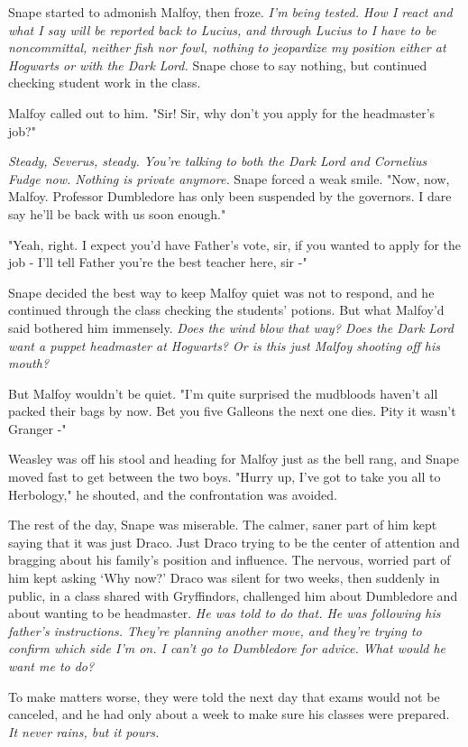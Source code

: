 Snape started to admonish Malfoy, then froze. \emph{I'm being tested. How I react and what I say will be reported back to Lucius, and through Lucius to{\el} I have to be noncommittal, neither fish nor fowl, nothing to jeopardize my position either at Hogwarts or with the Dark Lord.} Snape chose to say nothing, but continued checking student work in the class.

Malfoy called out to him. "Sir! Sir, why don't you apply for the headmaster's job?"

\emph{Steady, Severus, steady. You're talking to both the Dark Lord and Cornelius Fudge now. Nothing is private anymore.} Snape forced a weak smile. "Now, now, Malfoy. Professor Dumbledore has only been suspended by the governors. I dare say he'll be back with us soon enough."

"Yeah, right. I expect you'd have Father's vote, sir, if you wanted to apply for the job - I'll tell Father you're the best teacher here, sir -"

Snape decided the best way to keep Malfoy quiet was not to respond, and he continued through the class checking the students' potions. But what Malfoy'd said bothered him immensely. \emph{Does the wind blow that way? Does the Dark Lord want a puppet headmaster at Hogwarts? Or is this just Malfoy shooting off his mouth?}

But Malfoy wouldn't be quiet. "I'm quite surprised the mudbloods haven't all packed their bags by now. Bet you five Galleons the next one dies. Pity it wasn't Granger -"

Weasley was off his stool and heading for Malfoy just as the bell rang, and Snape moved fast to get between the two boys. "Hurry up, I've got to take you all to Herbology," he shouted, and the confrontation was avoided.

The rest of the day, Snape was miserable. The calmer, saner part of him kept saying that it was just Draco. Just Draco trying to be the center of attention and bragging about his family's position and influence. The nervous, worried part of him kept asking `Why now?' Draco was silent for two weeks, then suddenly in public, in a class shared with Gryffindors, challenged him about Dumbledore and about wanting to be headmaster. \emph{He was told to do that. He was following his father's instructions. They're planning another move, and they're trying to confirm which side I'm on. I can't go to Dumbledore for advice. What would he want me to do?}

To make matters worse, they were told the next day that exams would not be canceled, and he had only about a week to make sure his classes were prepared. \emph{It never rains, but it pours.}

